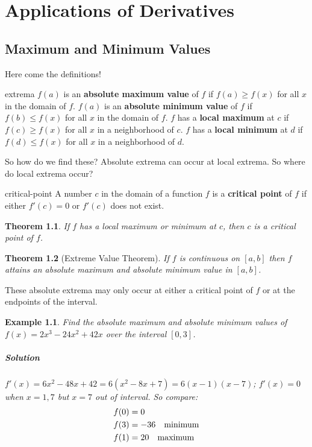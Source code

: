 \documentclass[letterpaper, 11pt, openany]{book}
\theoremstyle{mytheoremstyle}
\newtheorem{theorem}{Theorem}[section]
\theoremstyle{myexamplestyle}
\newtheorem{example}{Example}[section]
\newenvironment{solution}{\paragraph{\sffamily \smaller \fontseries{b}\selectfont Solution}}{\hfill\faSquare}
\begin{document}
\newpage\thispagestyle{firstofchapter}
\chapter{Applications of Derivatives}
\section{Maximum and Minimum Values}
\setcounter{figure}{0}

Here come the definitions!

\begin{definition}{}{extrema}
    \(f(a)\) is an \textbf{absolute maximum value} of \(f\) if \(f(a) \geq f(x)\) for all \(x\) in the domain of \(f\). \(f(a)\) is an \textbf{absolute minimum value} of \(f\) if \(f(b) \leq f(x)\) for all \(x\) in the domain of \(f\). \(f\) has a \textbf{local maximum} at \(c\) if \(f(c) \geq f(x)\) for all \(x\) in a neighborhood of \(c\). \(f\) has a \textbf{local minimum} at \(d\) if \(f(d) \leq f(x)\) for all \(x\) in a neighborhood of \(d\). 
\end{definition}

So how do we find these? Absolute extrema can occur at local extrema. So where do local extrema occur?

\begin{definition}{}{critical-point}
    A number \(c\) in the domain of a function \(f\) is a \textbf{critical point} of \(f\) if either \(f'(c) = 0\) or \(f'(c)\) does not exist.
\end{definition}

\begin{theorem}\label{t:local-extrema-conditions}
    If \(f\) has a local maximum or minimum at \(c\), then \(c\) is a critical point of \(f\).
\end{theorem}

\begin{theorem}[Extreme Value Theorem]\label{t:extreme-value}
    If \(f\) is continuous on \([a,b]\) then \(f\) attains an absolute maximum and absolute minimum value in \([a,b]\).
\end{theorem}

These absolute extrema may only occur at either a critical point of \(f\) or at the endpoints of the interval.

\begin{example}\label{absmaxmin-poly}
    Find the absolute maximum and absolute minimum values of $f(x) = 2x^{3} - 24x^{2} + 42x$ over the interval $[0, 3]$.
    \begin{solution}
        $f'(x) = 6x^{2} - 48x + 42 = 6(x^{2} - 8x + 7) = 6(x-1)(x-7)$; $f'(x) = 0$ when $x=1, 7$ but $x=7$ out of interval. So compare:
        \begin{align*}
            f(0) &= 0\\
            f(3) &= -36\text{\quad minimum}\\
            f(1) &= 20\text{\quad maximum}
        \end{align*}
    \end{solution}
\end{example}
\end{document}
